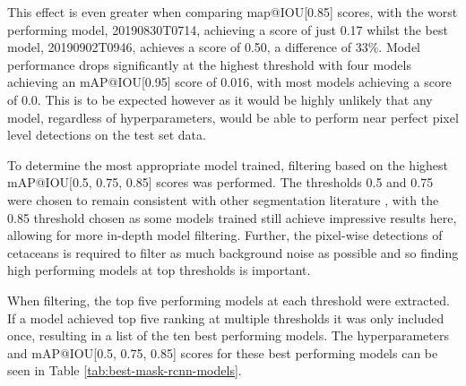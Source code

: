 This effect is even greater when comparing map@IOU[0.85] scores, with the worst performing model, 20190830T0714,  achieving a score of just 0.17 whilst the best model, 20190902T0946, achieves a score of 0.50, a difference of 33\%. Model performance drops significantly at the highest threshold with four models achieving an mAP@IOU[0.95] score of 0.016, with most models achieving a score of 0.0. This is to be expected however as it would be highly unlikely that any model, regardless of hyperparameters, would be able to perform near perfect pixel level detections on the test set data. 

To determine the most appropriate model trained, filtering based on the highest mAP@IOU[0.5, 0.75, 0.85] scores was performed. The thresholds 0.5 and 0.75 were chosen to remain consistent with other segmentation literature \cite{bolya_yolact_2019, wang_solov2_2020, tian_fcos_2019}, with the 0.85 threshold chosen as some models trained still achieve impressive results here, allowing for more in-depth model filtering. Further, the pixel-wise detections of cetaceans is required to filter as much background noise as possible and so finding high performing models at top thresholds is important.

When filtering, the top five performing models at each threshold were extracted. If a model achieved top five ranking at multiple thresholds it was only included once, resulting in a list of the ten best performing models. The hyperparameters and mAP@IOU[0.5, 0.75, 0.85] scores for these best performing models can be seen in Table \ref{tab:best-mask-rcnn-models}.

